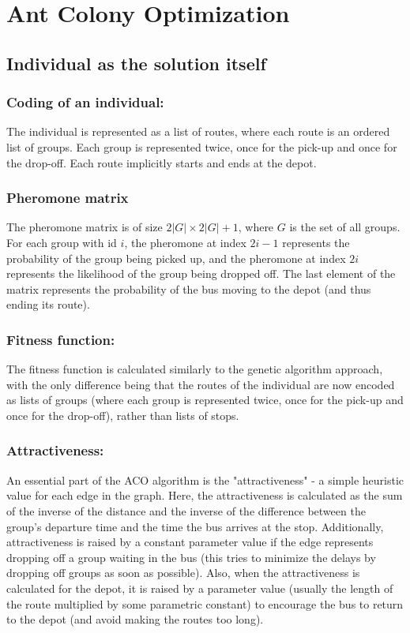 \section{Ant Colony Optimization}


\subsection{Individual as the solution itself}


\iffalse

\subsubsection*{Coding of an individual:}
The individual is represented as a list of routes, where each route is an ordered list of groups. Each group is represented twice, once for the pick-up and once for the drop-off. Each route implicitly starts and ends at the depot.

\subsubsection*{Pheromone matrix}
The pheromone matrix is of size $2|G| \times 2|G| + 1$, where $G$ is the set of all groups. For each group with id $i$, the pheromone at index $2i - 1$ represents the probability of the group being picked up, and the pheromone at index $2i$ represents the likelihood of the group being dropped off. The last element of the matrix represents the probability of the bus moving to the depot (and thus ending its route).

\subsubsection*{Fitness function:}
The fitness function is calculated similarly to the genetic algorithm approach, with the only difference being that the routes of the individual are now encoded as lists of groups (where each group is represented twice, once for the pick-up and once for the drop-off), rather than lists of stops.

\subsubsection*{Attractiveness:}
An essential part of the ACO algorithm is the "attractiveness" - a simple heuristic value for each edge in the graph. Here, the attractiveness is calculated as the sum of the inverse of the distance and the inverse of the difference between the group's departure time and the time the bus arrives at the stop. Additionally, attractiveness is raised by a constant parameter value if the edge represents dropping off a group waiting in the bus (this tries to minimize the delays by dropping off groups as soon as possible). Also, when the attractiveness is calculated for the depot, it is raised by a parameter value (usually the length of the route multiplied by some parametric constant) to encourage the bus to return to the depot (and avoid making the routes too long).

